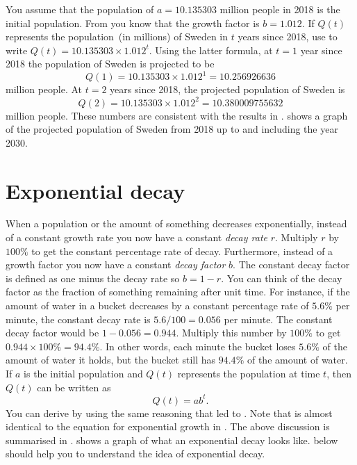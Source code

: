 \documentclass[a4paper,oneside,12pt]{article}
\begin{document}
{\begin{solution}
You assume that the population of $a = 10.135303$ million people in
2018 is the initial population.
From  you know that
the growth factor is $b = 1.012$.  If $Q(t)$ represents the
population~(in millions) of Sweden in $t$ years since 2018, use
 to write
$Q(t) = 10.135303 \times 1.012^t$.  Using the latter formula, at
$t = 1$ year since 2018 the population of Sweden is projected to be
\[
Q(1)
=
10.135303 \times 1.012^1
=
10.256926636
\]
million people.  At $t = 2$ years since 2018, the projected population
of Sweden is
\[
Q(2)
=
10.135303 \times 1.012^2
=
10.380009755632
\]
million people.  These numbers are consistent with the results
in .
 shows a graph of the projected
population of Sweden from 2018 up to and including the year 2030.
\end{solution}
}{}



\section{Exponential decay}

When a population or the amount of something decreases exponentially,
instead of a constant growth rate you now have a constant
\emph{decay rate} $r$.  Multiply $r$ by $100\%$ to get the constant
percentage rate of decay.  Furthermore, instead of a growth factor you
now have a constant \emph{decay factor} $b$.  The constant decay
factor is defined as one minus the decay rate so $b = 1 - r$.  You can
think of the decay factor as the fraction of something remaining after
unit time.  For instance, if the amount of water in a bucket decreases
by a constant percentage rate of $5.6\%$ per minute, the constant
decay rate is $5.6 / 100 = 0.056$ per minute.  The constant decay
factor would be $1 - 0.056 = 0.944$.  Multiply this number by $100\%$
to get $0.944 \times 100\% = 94.4\%$.  In other words, each minute the
bucket loses $5.6\%$ of the amount of water it holds, but the bucket
still has $94.4\%$ of the amount of water.  If $a$ is the initial
population and $Q(t)$ represents the population at time $t$, then
$Q(t)$ can be written as
\begin{equation}
\label{eqn:exponential_decay}
Q(t)
=
ab^t.
\end{equation}
You can derive  by using the same
reasoning that led to .  Note that
 is almost identical to the equation
for exponential growth in .  The above
discussion is summarised in .
 shows a graph of what an exponential
decay looks like.   below should help
you to understand the idea of exponential decay.
\end{document}
